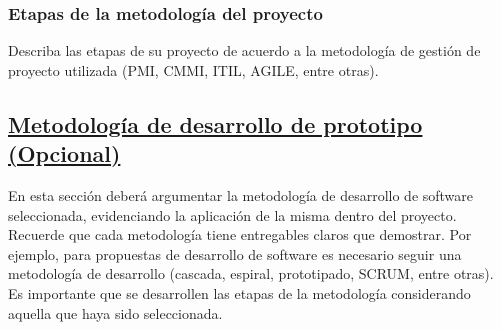 \documentclass[12pt, a4paper, nofontenc, numbers=endperiod]{apa7}
\begin{document}
{\subsubsection*{\normalsize Etapas de la metodología del proyecto }

\setlength{\parindent}{1.27cm}Describa las etapas de su proyecto de acuerdo a la metodología de gestión de proyecto utilizada (PMI, CMMI, ITIL, AGILE, entre otras).

\subsection*{\normalsize \underline{Metodología de desarrollo de prototipo (Opcional)}}

\setlength{\parindent}{1.27cm}En esta sección deberá argumentar la metodología de desarrollo de software seleccionada, evidenciando la aplicación de la misma dentro del proyecto. Recuerde que cada metodología tiene entregables claros que demostrar. Por ejemplo, para propuestas de desarrollo de software es necesario seguir una metodología de desarrollo (cascada, espiral, prototipado, SCRUM, entre otras). Es importante que se desarrollen las etapas de la metodología considerando aquella que haya sido seleccionada. 

}
\end{document}
